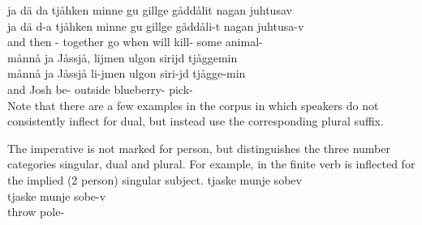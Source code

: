 \ea\label{inflectionalCatsVerbsEx1}%
\glll	ja dä da tjåhken minne gu gillge gåddålit nagan juhtusav\\
	ja dä d-a tjåhken minne gu gillge gåddåli-t nagan juhtusa-v\\
	and then -\BS{} together go\BS{} when will\BS{} kill- some animal-\\\nopagebreak
{}	
\z
\ea\label{inflectionalCatsVerbsEx2}%
\glll	månnå ja Jåssjå, lijmen ulgon sirijd tjåggemin\\
	månnå ja Jåssjå li-jmen ulgon siri-jd tjågge-min\\
	 and Josh\BS{} be- outside blueberry- pick-\\\nopagebreak
{}	
\z
Note that there are a few examples in the corpus in which speakers do not consistently inflect for dual, but instead use the corresponding plural suffix. 

The imperative is not marked for person, but distinguishes the three number categories singular, dual and plural. 
For example, in  the finite verb  is inflected for the implied (2 person) singular subject. %
\ea\label{inflectionalCatsVerbsEx3}%
\glll	tjaske munje sobev\\
	tjaske munje sobe-v\\
	throw\BS{}  pole-\\\nopagebreak
{}	
\z

